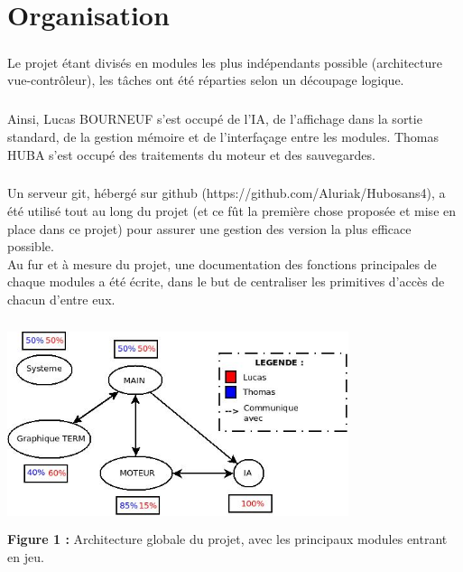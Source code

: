 \documentclass{report}
\begin{document}
\chapter{Organisation}
    \paragraph*{}
    Le projet étant divisés en modules les plus indépendants possible (architecture vue-contrôleur), les tâches ont été réparties selon un découpage logique.
    \paragraph*{}
    Ainsi, Lucas BOURNEUF s'est occupé de l'IA, de l'affichage dans la sortie standard, de la gestion mémoire et de l'interfaçage entre les modules. 
    Thomas HUBA s'est occupé des traitements du moteur et des sauvegardes.
    \paragraph*{}
    Un serveur git, hébergé sur github (https://github.com/Aluriak/Hubosans4), a été utilisé tout au long du projet (et ce fût la première chose proposée et mise en place dans ce projet) 
    pour assurer une gestion des version la plus efficace possible.\\
    Au fur et à mesure du projet, une documentation des fonctions principales de chaque modules a été écrite, dans le but de centraliser les primitives d'accès de chacun d'entre eux.

        \vspace{1cm}
        \begin{center}
            \includegraphics[width=10cm, height=6cm]{ressources/presentation/archi_projet.jpeg} \\
            \textbf{Figure 1 :} Architecture globale du projet, avec les principaux modules entrant en jeu.
        \end{center}
\end{document}
